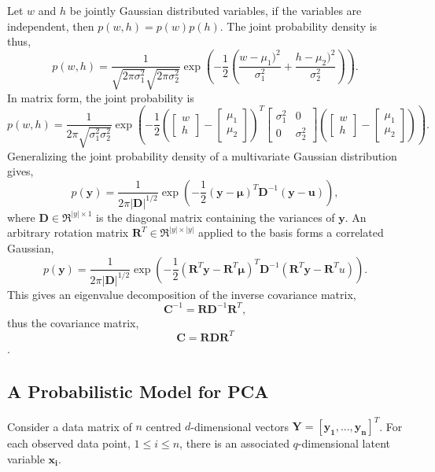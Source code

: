 \documentclass[ %
                    author={Dillon Keith Diep [INCOMPLETE DRAFT, NOT FOR SUBMISSION]},
                supervisor={Dr. Carl Henrik Ek},
                    degree={MEng},
                     title={ARt-CG:},
                  subtitle={Assisted Real-time Content Generation of 3D Hair by Learning Manifolds},
                      type={Research},
                      year={2014} ]{dissertation}
\begin{document}
\noindent
Let $w$ and $h$ be jointly Gaussian distributed variables, if the variables are independent, then $p(w,h)=p(w)p(h)$.
The joint probability density is thus,
$$p(w,h)=\frac{1}{\sqrt{2\pi\sigma^2_1}\sqrt{2\pi\sigma^2_2}}\exp\left(-\frac{1}{2}\left(\frac{w-\mu_1)^2}{\sigma^2_1}+\frac{h-\mu_2)^2}{\sigma^2_2}\right)\right).$$
In matrix form, the joint probability is
$$p(w,h)=\frac{1}{2\pi\sqrt{\sigma^2_1\sigma^2_2}}\exp
\left(
	-\frac{1}{2}
	\left(
		\left[
			\begin{matrix}
			w \\
			h
			\end{matrix}
		\right]
		-
		\left[
			\begin{matrix}
			\mu_1 \\
			\mu_2
			\end{matrix}
		\right]
	\right)^T
	\left[
		\begin{matrix}
		\sigma^2_1	&	0\\
		0			&	\sigma^2_2
		\end{matrix}
	\right]
	\left(
		\left[
			\begin{matrix}
			w \\
			h
			\end{matrix}
		\right]
		-
		\left[
			\begin{matrix}
			\mu_1 \\
			\mu_2
			\end{matrix}
		\right]
	\right)
\right).$$
Generalizing the joint probability density of a multivariate Gaussian distribution gives,
$$p(\pmb{y})=\frac{1}{2\pi|\pmb{D}|^{1/2}}\exp\left(-\frac{1}{2}(\pmb{y}-\pmb{\mu})^T\pmb{D}^{-1}(\pmb{y}-\pmb{u})\right),$$
where $\pmb{D}\in\Re^{|y| \times 1}$ is the diagonal matrix containing the variances of $\pmb{y}$.
An arbitrary rotation matrix $\pmb{R}^T\in\Re^{|y| \times |y|}$ applied to the basis forms a correlated Gaussian,
$$p(\pmb{y})=\frac{1}{2\pi|\pmb{D}|^{1/2}}\exp\left(-\frac{1}{2}(\pmb{R}^T\pmb{y}-\pmb{R}^T\pmb{\mu})^T\pmb{D}^{-1}(\pmb{R}^T\pmb{y}-\pmb{R}^T{u})\right).$$
This gives an eigenvalue decomposition of the inverse covariance matrix, 
$$\pmb{C}^{-1}=\pmb{RD}^{-1}\pmb{R}^T,$$
thus the covariance matrix, 
$$\pmb{C}=\pmb{RDR}^T$$.

\subsection{A Probabilistic Model for PCA}
Consider a data matrix of $n$ centred $d$-dimensional vectors $\mathbf{Y=[y_1,...,y_n]}^T$.
For each observed data point, $1 \leq i \leq n $, there is an associated $q$-dimensional latent variable $\mathbf{x_i}$.
\end{document}
